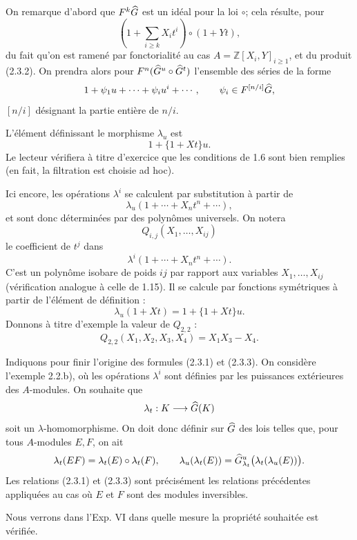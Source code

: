 \documentclass[11pt]{article}
\begin{document}
On remarque d'abord que \(F^k\widehat G\) est un idéal pour la loi \(\circ\); cela résulte, pour
\[
  \left(1+\sum_{i\geq k}X_i t^i\right)\circ(1+Yt),
\]
du fait qu'on est ramené par fonctorialité au cas \(A=\mathbb Z[X_i,Y]_{i\geq1}\), et du produit (2.3.2). On prendra alors pour \(F^n(\widehat G^u\circ\widehat G^t)\) l'ensemble des séries de la forme
\[
  1+\psi_1u+\cdots+\psi_i u^i+\cdots,\qquad
  \psi_i\in F^{[n/i]}\widehat G,
\]
\([n/i]\) désignant la partie entière de \(n/i\).

L'élément définissant le morphisme \(\lambda_u\) est
\[
  1+\{1+Xt\}u.
\]
Le lecteur vérifiera à titre d'exercice que les conditions de 1.6 sont bien remplies (en fait, la filtration est choisie ad hoc).

Ici encore, les opérations \(\lambda^i\) se calculent par substitution à partir de
\[
  \lambda_u(1+\cdots+X_nt^n+\cdots),
\]
et sont donc déterminées par des polynômes universels. On notera
\[
  Q_{i,j}(X_1,\ldots,X_{ij})
\]
le coefficient de \(t^j\) dans
\[
  \lambda^i(1+\cdots+X_nt^n+\cdots).
\]
C'est un polynôme isobare de poids \(ij\) par rapport aux variables \(X_1,\ldots,X_{ij}\) (vérification analogue à celle de 1.15). Il se calcule par fonctions symétriques à partir de l'élément de définition :
\begin{equation}\tag{2.3.3}
  \lambda_u(1+Xt)=1+\{1+Xt\}u.
\end{equation}
Donnons à titre d'exemple la valeur de \(Q_{2,2}\) :
\[
  Q_{2,2}(X_1,X_2,X_3,X_4)=X_1X_3-X_4.
\]

Indiquons pour finir l'origine des formules (2.3.1) et (2.3.3). On considère l'exemple 2.2.b), où les opérations \(\lambda^i\) sont définies par les puissances extérieures des \(A\)-modules. On souhaite que
\[
  \lambda_t:K\longrightarrow\widehat G(K)
\]
soit un \(\lambda\)-homomorphisme. On doit donc définir sur \(\widehat G\) des lois telles que, pour tous \(A\)-modules \(E,F\), on ait
\[
  \lambda_t(EF)=\lambda_t(E)\circ\lambda_t(F),\qquad
  \lambda_u(\lambda_t(E))=\widehat G^u_{\lambda_t}\bigl(\lambda_t(\lambda_u(E))\bigr).
\]
Les relations (2.3.1) et (2.3.3) sont précisément les relations précédentes appliquées au cas où \(E\) et \(F\) sont des modules inversibles.

Nous verrons dans l'Exp. VI dans quelle mesure la propriété souhaitée est vérifiée.
\end{document}
